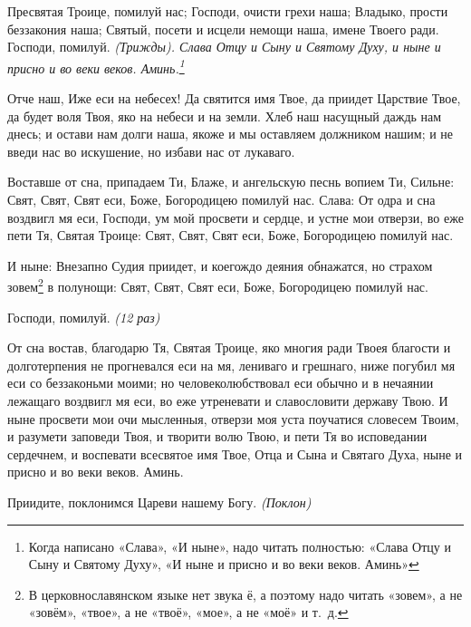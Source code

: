 

Пресвятая Троице, помилуй нас; Господи, очисти грехи наша; Владыко, прости беззакония наша; Святый, посети и исцели немощи наша, имене Твоего ради.
Господи, помилуй. \itshape (Трижды)\normalfont{}. Слава Отцу и Сыну и Святому Духу, и ныне и присно и во веки веков. Аминь.\footnote{Когда написано «Слава», «И ныне», надо читать полностью: «Слава Отцу и Сыну и Святому Духу», «И ныне и присно и во веки веков. Аминь»}




Отче наш, Иже еси на небесех! Да святится имя Твое, да приидет Царствие Твое, да будет воля Твоя, яко на небеси и на земли. Хлеб наш насущный даждь нам днесь; и остави нам долги наша, якоже и мы оставляем должником нашим; и не введи нас во искушение, но избави нас от лукаваго.






Воставше от сна, припадаем Ти, Блаже, и ангельскую песнь вопием Ти, Сильне: Свят, Свят, Свят еси, Боже, Богородицею помилуй нас.
Слава: От одра и сна воздвигл мя еси, Господи, ум мой просвети и сердце, и устне мои отверзи, во еже пети Тя, Святая Троице: Свят, Свят, Свят еси, Боже, Богородицею помилуй нас. 



И ныне: Внезапно Судия приидет, и коегождо деяния обнажатся, но страхом зовем\footnote{В церковнославянском языке нет звука ё, а поэтому надо читать «зовем», а не «зовём», «твое», а не «твоё», «мое», а не «моё» и т.~д.} в полунощи: Свят, Свят, Свят еси, Боже, Богородицею помилуй нас.

Господи, помилуй. \itshape (12 раз)\normalfont{}




От сна востав, благодарю Тя, Святая Троице, яко многия ради Твоея благости и долготерпения не прогневался еси на мя, лениваго и грешнаго, ниже погубил мя еси со беззаконьми моими; но человеколюбствовал еси обычно и в нечаянии лежащаго воздвигл мя еси, во еже утреневати и славословити державу Твою. И ныне просвети мои очи мысленныя, отверзи моя уста поучатися словесем Твоим, и разумети заповеди Твоя, и творити волю Твою, и пети Тя во исповедании сердечнем, и воспевати всесвятое имя Твое, Отца и Сына и Святаго Духа, ныне и присно и во веки веков. Аминь.


Приидите, поклонимся Цареви нашему Богу. \itshape (Поклон)\normalfont{}


